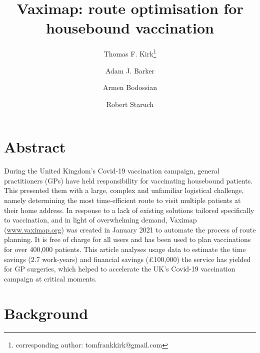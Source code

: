 \documentclass{article}
\def\vm{Vaximap}
\begin{document}
\title{\textbf{\vm{}{}: route optimisation for housebound vaccination}}

\author[1,2]{Thomas F. Kirk\thanks{corresponding author: tomfrankkirk@gmail.com}}
\author[3]{Adam J. Barker}
\author[4]{Armen Bodossian}
\author[1,5]{Robert Staruch}


\maketitle
\doublespacing
\linenumbers

\section{Abstract}

During the United Kingdom’s Covid-19 vaccination campaign, general practitioners (GPs) have held responsibility for vaccinating housebound patients. This presented them with a large, complex and unfamiliar logistical challenge, namely determining the most time-efficient route to visit multiple patients at their home address. In response to a lack of existing solutions tailored specifically to vaccination, and in light of overwhelming demand, \vm{} (\url{www.vaximap.org}) was created in January 2021 to automate the process of route planning. It is free of charge for all users and has been used to plan vaccinations for over 400,000 patients. This article analyses usage data to estimate the time savings (2.7 work-years) and financial savings (£100,000) the service has yielded for GP surgeries, which helped to accelerate the UK’s Covid-19 vaccination campaign at 
 critical moments.

\section{Background}
\label{sec:background}
\end{document}
